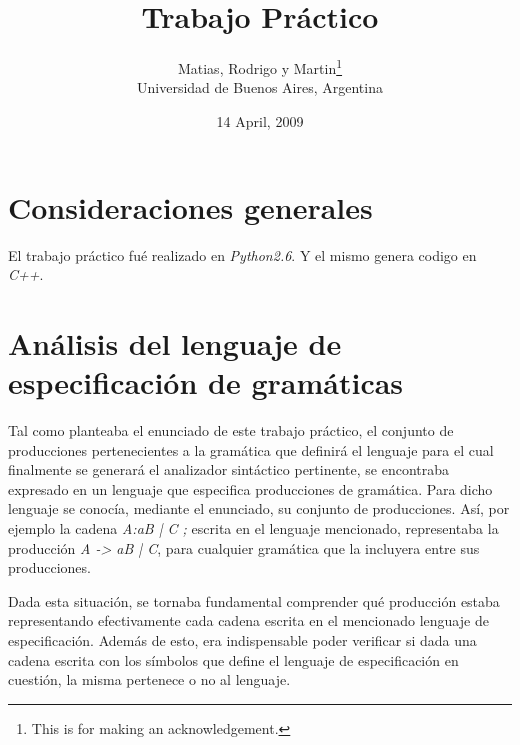 \documentclass[a4paper]{report}
\begin{document}
	\setcounter{page}{0} %

\title{Trabajo Práctico}
\author{Matias, Rodrigo y Martin\thanks{This is for making an acknowledgement.}
\\Universidad de Buenos Aires, Argentina}
\date{14 April, 2009}



\maketitle


\newpage

\clearpage

\section*{Consideraciones generales}

El trabajo práctico fué realizado en \emph{Python2.6}. Y el mismo genera codigo en \emph{C++}.

\section*{Análisis del lenguaje de especificación de gramáticas}

Tal como planteaba el enunciado de este trabajo práctico, el conjunto de producciones pertenecientes a la gramática que definirá el lenguaje para el cual finalmente se generará el analizador sintáctico pertinente, se encontraba expresado en un lenguaje que especifica producciones de gramática. Para dicho lenguaje se conocía, mediante el enunciado, su conjunto de producciones. Así, por ejemplo la cadena \emph{ A:aB | C ; } escrita en el lenguaje mencionado, representaba la producción \emph{A -> aB | C}, para cualquier gramática que la incluyera entre sus producciones.


Dada esta situación, se tornaba fundamental comprender qué producción estaba representando efectivamente cada cadena escrita en el mencionado lenguaje de especificación. Además de esto, era indispensable poder verificar si dada una cadena escrita con los símbolos que define el lenguaje de especificación en cuestión, la misma pertenece o no al lenguaje.
\end{document}
